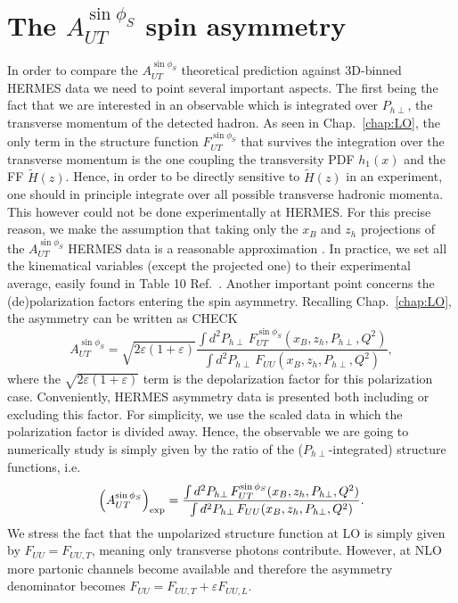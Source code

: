 \section{The $A_{UT}^{\sin\phi_S}$ spin asymmetry}
In order to compare the $A_{UT}^{\sin\phi_S}$ theoretical prediction against 3D-binned HERMES data we need to point several important aspects. The first being the fact that we are interested in an observable which is integrated over $P_{h\perp}$, the transverse momentum of the detected hadron. As seen in Chap.~\ref{chap:LO}, the only term in the structure function $F_{UT}^{\sin\phi_S}$ that survives the integration over the transverse momentum is the one coupling the transversity PDF $h_1(x)$ and the FF $\tilde{H}(z)$. Hence, in order to be directly sensitive to $\tilde{H}(z)$ in an experiment, one should in principle integrate over all possible transverse hadronic momenta. This however could not be done experimentally at HERMES. For this precise reason, we make the assumption that taking only the $x_B$ and $z_h$ projections of the $A_{UT}^{\sin\phi_S}$ HERMES data is a reasonable approximation \cite{Gamberg2022Htilde}. In practice, we set all the kinematical variables (except the projected one) to their experimental average, easily found in Table 10 Ref.~\cite{hermescollaboration2020azimuthalsingledoublespinasymmetries}. Another important point concerns the (de)polarization factors entering the spin asymmetry. Recalling Chap.~\ref{chap:LO},  the asymmetry can be written as CHECK
\begin{equation}
    A_{UT}^{\sin\phi_S} = \sqrt{2\varepsilon(1+\varepsilon)}\frac{\int d^2P_{h\perp}\,F_{UT}^{\sin\phi_S}(x_B,z_h,P_{h\perp},Q^2)}{\int d^2P_{h\perp}\, F_{UU}(x_B,z_h,P_{h\perp},Q^2)},
\end{equation}
where the $ \sqrt{2\varepsilon(1+\varepsilon)}$ term is the depolarization factor for this polarization case. Conveniently, HERMES asymmetry data is presented both including or excluding this factor. For simplicity, we use the scaled data in which the polarization factor is divided away. Hence, the observable we are going to numerically study is simply given by the ratio of the ($P_{h\perp}$-integrated) structure functions, i.e.
\begin{equation}
    \left(A_{UT}^{\sin\phi_S}\right)_{\rm exp} =\frac{\int d^2P_{h\perp}\,F_{UT}^{\sin\phi_S}(x_B,z_h,P_{h\perp},Q^2)}{\int d^2P_{h\perp}\, F_{UU}(x_B,z_h,P_{h\perp},Q^2)}.
\end{equation}
We stress the fact that the unpolarized structure function at LO is simply given by $F_{UU}=F_{UU,T}$, meaning only transverse photons contribute. However, at NLO more partonic channels become available and therefore the asymmetry denominator becomes $F_{UU}=F_{UU,T}+\varepsilon F_{UU,L}$.


